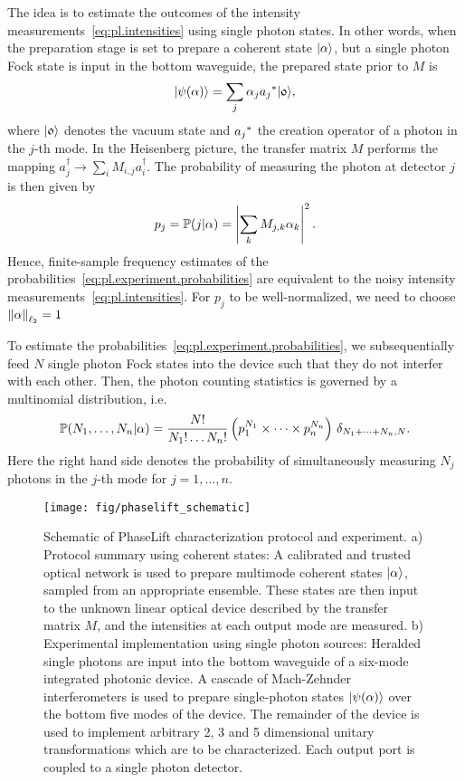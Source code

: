 The idea is to estimate the outcomes of the intensity measurements~\eqref{eq:pl.intensities} using single photon states.
In other words, when the preparation stage is set to prepare a coherent state $\ket{{\alpha}}$, but a single photon Fock state is input in the bottom waveguide, the prepared state prior to $M$ is
\[
  \ket{\psi({\alpha})} = \sum_j \alpha_j \adj{a_j} \ket{\mathfrak{0}},
\]
where $\ket{\mathfrak{0}}$ denotes the vacuum state and ${{a_j}^\ast}$ the creation operator of a photon in the $j$-th mode.
In the Heisenberg picture, the transfer matrix $M$ performs the mapping $a_j^{\dag} \rightarrow \sum_i M_{i,j}a_i^{\dag}$.
The probability of measuring the photon at detector $j$ is then given by
\[
  p_j = \mathbb{P}(j|{\alpha}) = \left| \sum_k M_{j,k} \alpha_k \right|^2.
  \label{eq:pl.experiment.probabilities}
\]
Hence, finite-sample frequency estimates of the probabilities~\eqref{eq:pl.experiment.probabilities} are equivalent to the noisy intensity measurements~\eqref{eq:pl.intensities}.
For $p_j$ to be well-normalized, we need to choose ${\Vert\alpha\Vert}_{\ell_2} = 1$

To estimate the probabilities~\eqref{eq:pl.experiment.probabilities}, we subsequentially feed $N$ single photon Fock states into the device such that they do not interfer with each other.
Then, the photon counting statistics is governed by a multinomial distribution, i.e.
\[
\mathbb{P}(N_1, \ldots, N_n | \alpha) = \frac{N!}{N_1! \ldots N_n!} \left( p_1^{N_1} \times \cdots \times p_n^{N_n} \right) \, \delta_{N_1 + \cdots + N_n, N}.
  \label{eq:pl.photon_stats}
\]
Here the right hand side denotes the probability of simultaneously measuring $N_j$ photons in the $j$-th mode for $j=1,\ldots,n$.


\begin{figure*}[tbp]
  \centering
  \texttt{[image: fig/phaselift\_schematic]}%
  \caption{%
    \label{fig:pl.experimental.schematic}%
     Schematic of PhaseLift characterization protocol and experiment.
     a) Protocol summary using coherent states:
     A calibrated and trusted optical network is used to prepare multimode coherent states ${|{\alpha}\rangle}$, sampled from an appropriate ensemble.
     These states are then input to the unknown linear optical device described by the transfer matrix $M$, and the intensities at each output mode are measured.
     b) Experimental implementation using single photon sources:
     Heralded single photons are input into the bottom waveguide of a six-mode integrated photonic device.
     A cascade of Mach-Zehnder interferometers is used to prepare single-photon states ${|{\psi( \alpha)}\rangle}$ over the bottom five modes of the device.
     The remainder of the device is used to implement arbitrary 2, 3 and 5 dimensional unitary transformations which are to be characterized.
     Each output port is coupled to a single photon detector.
   }
\end{figure*}

